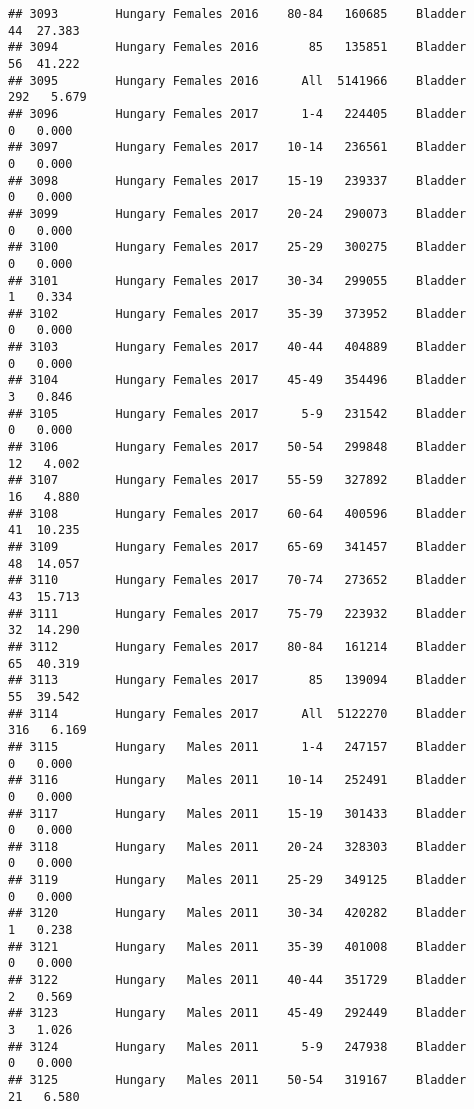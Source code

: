 \documentclass[
]{article}
\begin{document}
\begin{verbatim}
## 3093        Hungary Females 2016    80-84   160685    Bladder     44  27.383
## 3094        Hungary Females 2016       85   135851    Bladder     56  41.222
## 3095        Hungary Females 2016      All  5141966    Bladder    292   5.679
## 3096        Hungary Females 2017      1-4   224405    Bladder      0   0.000
## 3097        Hungary Females 2017    10-14   236561    Bladder      0   0.000
## 3098        Hungary Females 2017    15-19   239337    Bladder      0   0.000
## 3099        Hungary Females 2017    20-24   290073    Bladder      0   0.000
## 3100        Hungary Females 2017    25-29   300275    Bladder      0   0.000
## 3101        Hungary Females 2017    30-34   299055    Bladder      1   0.334
## 3102        Hungary Females 2017    35-39   373952    Bladder      0   0.000
## 3103        Hungary Females 2017    40-44   404889    Bladder      0   0.000
## 3104        Hungary Females 2017    45-49   354496    Bladder      3   0.846
## 3105        Hungary Females 2017      5-9   231542    Bladder      0   0.000
## 3106        Hungary Females 2017    50-54   299848    Bladder     12   4.002
## 3107        Hungary Females 2017    55-59   327892    Bladder     16   4.880
## 3108        Hungary Females 2017    60-64   400596    Bladder     41  10.235
## 3109        Hungary Females 2017    65-69   341457    Bladder     48  14.057
## 3110        Hungary Females 2017    70-74   273652    Bladder     43  15.713
## 3111        Hungary Females 2017    75-79   223932    Bladder     32  14.290
## 3112        Hungary Females 2017    80-84   161214    Bladder     65  40.319
## 3113        Hungary Females 2017       85   139094    Bladder     55  39.542
## 3114        Hungary Females 2017      All  5122270    Bladder    316   6.169
## 3115        Hungary   Males 2011      1-4   247157    Bladder      0   0.000
## 3116        Hungary   Males 2011    10-14   252491    Bladder      0   0.000
## 3117        Hungary   Males 2011    15-19   301433    Bladder      0   0.000
## 3118        Hungary   Males 2011    20-24   328303    Bladder      0   0.000
## 3119        Hungary   Males 2011    25-29   349125    Bladder      0   0.000
## 3120        Hungary   Males 2011    30-34   420282    Bladder      1   0.238
## 3121        Hungary   Males 2011    35-39   401008    Bladder      0   0.000
## 3122        Hungary   Males 2011    40-44   351729    Bladder      2   0.569
## 3123        Hungary   Males 2011    45-49   292449    Bladder      3   1.026
## 3124        Hungary   Males 2011      5-9   247938    Bladder      0   0.000
## 3125        Hungary   Males 2011    50-54   319167    Bladder     21   6.580

\end{verbatim}
\end{document}
